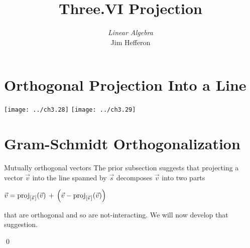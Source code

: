 \documentclass[10pt,t,serif,professionalfont]{beamer}
\title[Projection] %
{Three.VI Projection}
\author{\textit{Linear Algebra} \\ {\small Jim Hef{}feron}}
\institute{
  \texttt{http://joshua.smcvt.edu/linearalgebra}
}
\date{}
\begin{document}
\begin{frame}
  \titlepage
\end{frame}




\section{Orthogonal Projection Into a Line}
\begin{frame}
\begin{center}
  \texttt{[image: ../ch3.28]}
  \hspace*{0.6in}
  \texttt{[image: ../ch3.29]}      
\end{center}
\pause
{}

\pause
{}
\end{frame}
\begin{frame}
\df[df:ProjIntoLine]
\end{frame}



\section{Gram-Schmidt Orthogonalization}
\begin{frame}{Mutually orthogonal vectors}
The prior subsection suggests that
projecting a vector $\vec{v}$ into the line spanned by \( \vec{s} \)
decomposes $\vec{v}$ into two parts
\begin{center}  \small
  \vcenteredhbox{\texttt{[image: ../ch3.35]}}
   \qquad
   $\displaystyle \vec{v}=\proj{\vec{v}}{\spanof{\vec{s}\,}}
             \,+\,\left(\vec{v}-\proj{\vec{v}}{\spanof{\vec{s}\,}}\right)$
\end{center}
that are orthogonal and so are not-interacting.
We will now develop that suggestion.
\pause
\df[df:MutuallyOrthogonal]
\end{frame}




\begin{frame}
\th[th:OrthoIsInd]
\pause
\pf
{}
\qed
\end{frame}
\end{document}
